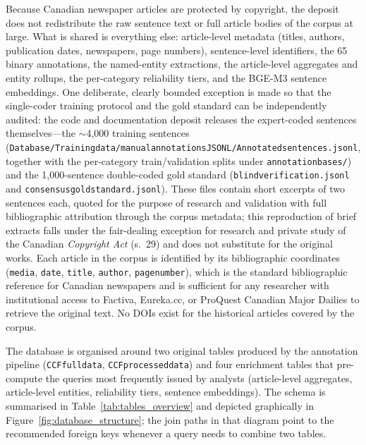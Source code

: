 \documentclass[12pt]{article}
\renewcommand\_{\texttt{\detokenize{_}\allowbreak}}
\begin{document}
Because Canadian newspaper articles are protected by copyright, the deposit does not redistribute the raw sentence text or full article bodies of the corpus at large. What is shared is everything else: article-level metadata (titles, authors, publication dates, newspapers, page numbers), sentence-level identifiers, the 65 binary annotations, the named-entity extractions, the article-level aggregates and entity rollups, the per-category reliability tiers, and the BGE-M3 sentence embeddings. One deliberate, clearly bounded exception is made so that the single-coder training protocol and the gold standard can be independently audited: the code and documentation deposit releases the expert-coded sentences themselves---the $\sim$4{,}000 training sentences (\texttt{Database/Training\_data/manual\_annotations\_JSONL/Annotated\_sentences.jsonl}, together with the per-category train/validation splits under \texttt{annotation\_bases/}) and the 1{,}000-sentence double-coded gold standard (\texttt{blind\_verification.jsonl} and \texttt{consensus\_gold\_standard.jsonl}). These files contain short excerpts of two sentences each, quoted for the purpose of research and validation with full bibliographic attribution through the corpus metadata; this reproduction of brief extracts falls under the fair-dealing exception for research and private study of the Canadian \emph{Copyright Act} (s.~29) and does not substitute for the original works. Each article in the corpus is identified by its bibliographic coordinates (\texttt{media}, \texttt{date}, \texttt{title}, \texttt{author}, \texttt{page\_number}), which is the standard bibliographic reference for Canadian newspapers and is sufficient for any researcher with institutional access to Factiva, Eureka.cc, or ProQuest Canadian Major Dailies to retrieve the original text. No DOIs exist for the historical articles covered by the corpus.

The database is organised around two original tables produced by the annotation pipeline (\texttt{CCF\_full\_data}, \texttt{CCF\_processed\_data}) and four enrichment tables that pre-compute the queries most frequently issued by analysts (article-level aggregates, article-level entities, reliability tiers, sentence embeddings). The schema is summarised in Table~\ref{tab:tables_overview} and depicted graphically in Figure~\ref{fig:database_structure}; the join paths in that diagram point to the recommended foreign keys whenever a query needs to combine two tables.
\end{document}
